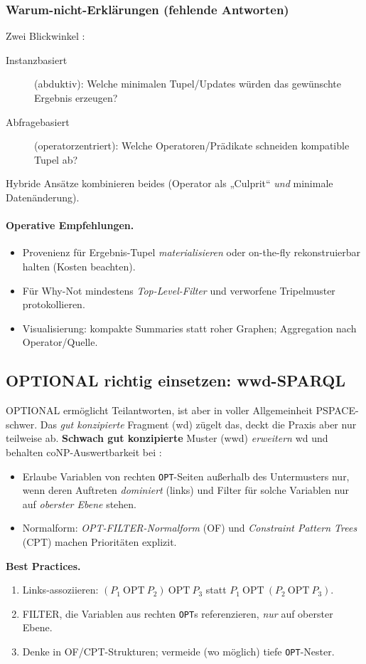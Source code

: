 \subsubsection{Warum-nicht-Erklärungen (fehlende Antworten)}
Zwei Blickwinkel \cite{herschel-why-why-not,herschel-survey}:
\begin{description}
  \item[Instanzbasiert] (abduktiv): Welche minimalen Tupel/Updates würden das gewünschte Ergebnis erzeugen?
  \item[Abfragebasiert] (operatorzentriert): Welche Operatoren/Prädikate schneiden kompatible Tupel ab?
\end{description}
Hybride Ansätze kombinieren beides (Operator als „Culprit“ \emph{und} minimale Datenänderung).

\paragraph{Operative Empfehlungen.}
\begin{itemize}
  \item Provenienz für Ergebnis-Tupel \emph{materialisieren} oder on-the-fly rekonstruierbar halten (Kosten beachten).
  \item Für Why-Not mindestens \emph{Top-Level-Filter} und verworfene Tripelmuster protokollieren.
  \item Visualisierung: kompakte Summaries statt roher Graphen; Aggregation nach Operator/Quelle.
\end{itemize}

\subsection{OPTIONAL richtig einsetzen: wwd-SPARQL}
OPTIONAL ermöglicht Teilantworten, ist aber in voller Allgemeinheit PSPACE-schwer. Das \emph{gut konzipierte} Fragment (wd) zügelt das, deckt die Praxis aber nur teilweise ab. \textbf{Schwach gut konzipierte} Muster (wwd) \emph{erweitern} wd und behalten coNP-Auswertbarkeit bei \cite{kaminski-kostylev-beyond-well-designed}:
\begin{itemize}
  \item Erlaube Variablen von rechten \texttt{OPT}-Seiten außerhalb des Untermusters nur, wenn deren Auftreten \emph{dominiert} (links) und Filter für solche Variablen nur auf \emph{oberster Ebene} stehen.
  \item Normalform: \emph{OPT-FILTER-Normalform} (OF) und \emph{Constraint Pattern Trees} (CPT) machen Prioritäten explizit.
\end{itemize}
\textbf{Best Practices.}
\begin{enumerate}
  \item Links-assoziieren: \((P_1~\mathrm{OPT}~P_2)~\mathrm{OPT}~P_3\) statt \(P_1~\mathrm{OPT}~(P_2~\mathrm{OPT}~P_3)\).
  \item FILTER, die Variablen aus rechten \texttt{OPT}s referenzieren, \emph{nur} auf oberster Ebene.
  \item Denke in OF/CPT-Strukturen; vermeide (wo möglich) tiefe \texttt{OPT}-Nester.
\end{enumerate}

